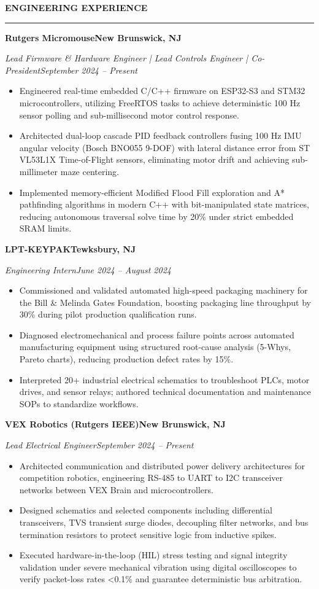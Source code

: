 \documentclass[10pt]{article}
\newcommand{\Section}[1]{%
  \vspace{4.0pt}%
  \textbf{\MakeUppercase{#1}}\par\vspace{-3.5pt}%
  \rule{\linewidth}{0.55pt}\par\vspace{2.5pt}%
}
\newcommand{\Company}[2]{\noindent\textbf{#1}\hfill\textbf{#2}\par}
\newcommand{\RoleDates}[2]{\noindent\textit{#1}\hfill\textit{#2}\par}
\begin{document}
\Section{Engineering Experience}
\Company{Rutgers Micromouse}{New Brunswick, NJ}
\RoleDates{Lead Firmware \& Hardware Engineer | Lead Controls Engineer | Co-President}{September 2024 -- Present}
\begin{itemize}
  \item Engineered real-time embedded C/C++ firmware on ESP32-S3 and STM32 microcontrollers, utilizing FreeRTOS tasks to achieve deterministic 100 Hz sensor polling and sub-millisecond motor control response.
  \item Architected dual-loop cascade PID feedback controllers fusing 100 Hz IMU angular velocity (Bosch BNO055 9-DOF) with lateral distance error from ST VL53L1X Time-of-Flight sensors, eliminating motor drift and achieving sub-millimeter maze centering.
  \item Implemented memory-efficient Modified Flood Fill exploration and A* pathfinding algorithms in modern C++ with bit-manipulated state matrices, reducing autonomous traversal solve time by 20\% under strict embedded SRAM limits.
\end{itemize}
\vspace{2pt}
\Company{LPT-KEYPAK}{Tewksbury, NJ}
\RoleDates{Engineering Intern}{June 2024 -- August 2024}
\begin{itemize}
  \item Commissioned and validated automated high-speed packaging machinery for the Bill \& Melinda Gates Foundation, boosting packaging line throughput by 30\% during pilot production qualification runs.
  \item Diagnosed electromechanical and process failure points across automated manufacturing equipment using structured root-cause analysis (5-Whys, Pareto charts), reducing production defect rates by 15\%.
  \item Interpreted 20+ industrial electrical schematics to troubleshoot PLCs, motor drives, and sensor relays; authored technical documentation and maintenance SOPs to standardize workflows.
\end{itemize}
\vspace{2pt}
\Company{VEX Robotics (Rutgers IEEE)}{New Brunswick, NJ}
\RoleDates{Lead Electrical Engineer}{September 2024 -- Present}
\begin{itemize}
  \item Architected communication and distributed power delivery architectures for competition robotics, engineering RS-485 to UART to I2C transceiver networks between VEX Brain and microcontrollers.
  \item Designed schematics and selected components including differential transceivers, TVS transient surge diodes, decoupling filter networks, and bus termination resistors to protect sensitive logic from inductive spikes.
  \item Executed hardware-in-the-loop (HIL) stress testing and signal integrity validation under severe mechanical vibration using digital oscilloscopes to verify packet-loss rates <0.1\% and guarantee deterministic bus arbitration.
\end{itemize}
\end{document}
